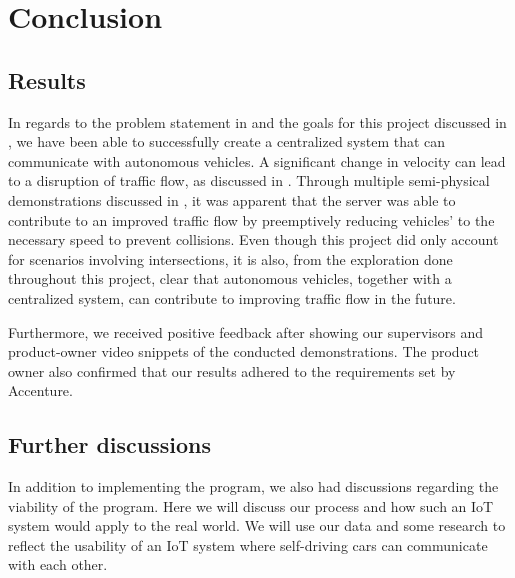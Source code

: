 \chapter{Conclusion}
\section{Results}
In regards to the problem statement in  and the goals for this project discussed in , we have been able to successfully create a centralized system that can communicate with autonomous vehicles. A significant change in velocity can lead to a disruption of traffic flow, as discussed in . Through multiple semi-physical demonstrations discussed in , it was apparent that the server was able to contribute to an improved traffic flow by preemptively reducing vehicles' to the necessary speed to prevent collisions. Even though this project did only account for scenarios involving intersections, it is also, from the exploration done throughout this project, clear that autonomous vehicles, together with a centralized system, can contribute to improving traffic flow in the future.

Furthermore, we received positive feedback after showing our supervisors and product-owner video snippets of the conducted demonstrations. The product owner also confirmed that our results adhered to the requirements set by Accenture.




\section{Further discussions}
In addition to implementing the program, we also had discussions regarding the viability of the program. Here we will discuss our process and how such an IoT system would apply to the real world. We will use our data and some research to reflect the usability of an IoT system where self-driving cars can communicate with each other.


